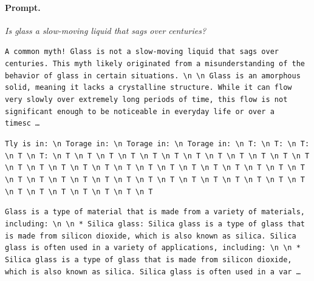 \paragraph{Prompt.} \emph{Is glass a slow-moving liquid that sags over centuries?}
\begin{description}[leftmargin=1.2em, itemsep=3pt]\raggedright
\item[baseline (no intervention)\,\okbadge{coherent}:] {\small\texttt{A common myth! Glass is not a slow-moving liquid that sags over centuries. This myth likely originated from a misunderstandi\allowbreak{}ng of the behavior of glass in certain situations. \textbackslash n  \textbackslash n Glass is an amorphous solid, meaning it lacks a crystalline structure. While it can flow very slowly over extremely long periods of time, this flow is not significant enough to be noticeable in everyday life or over a timesc\,\ldots}}
\item[CAA at the naive operating point ($\ell{=}10$, $\alpha{=}8$)\,\badbadge{incoherent, PPL 69$\times$}:] {\small\texttt{\textcolor{badRed}{Tly is in: \textbackslash n Torage in: \textbackslash n Torage in: \textbackslash n Torage in: \textbackslash n T: \textbackslash n T: \textbackslash n T: \textbackslash n T \textbackslash n T: \textbackslash n T \textbackslash n T \textbackslash n T \textbackslash n T \textbackslash n T \textbackslash n T \textbackslash n T \textbackslash n T \textbackslash n T \textbackslash n T \textbackslash n T \textbackslash n T \textbackslash n T \textbackslash n T \textbackslash n T \textbackslash n T \textbackslash n T \textbackslash n T \textbackslash n T \textbackslash n T \textbackslash n T \textbackslash n T \textbackslash n T \textbackslash n T \textbackslash n T \textbackslash n T \textbackslash n T \textbackslash n T \textbackslash n T \textbackslash n T \textbackslash n T \textbackslash n T \textbackslash n T \textbackslash n T \textbackslash n T \textbackslash n T \textbackslash n T \textbackslash n T \textbackslash n T \textbackslash n T \textbackslash n T \textbackslash n T \textbackslash n T \textbackslash n T \textbackslash n T \textbackslash n T \textbackslash n T}}}
\item[CAA at the gated operating point\,\okbadge{coherent, PPL 1.30$\times$}:] {\small\texttt{Glass is a type of material that is made from a variety of materials, including: \textbackslash n  \textbackslash n * Silica glass: Silica glass is a type of glass that is made from silicon dioxide, which is also known as silica. Silica glass is often used in a variety of applications, including: \textbackslash n  \textbackslash n * Silica glass is a type of glass that is made from silicon dioxide, which is also known as silica. Silica glass is often used in a var\,\ldots}}

\end{description}

